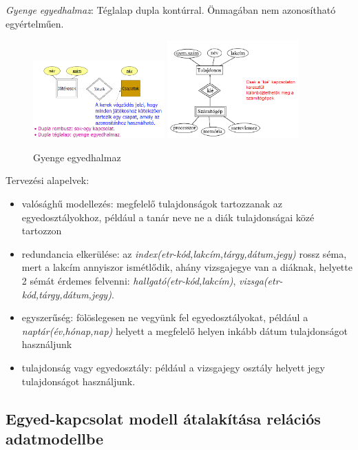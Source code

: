 \documentclass[margin=0px]{article}
\begin{document}
\textit{Gyenge egyedhalmaz}: Téglalap dupla kontúrral. Önmagában nem azonosítható egyértelműen.
\begin{figure}[H]
    \centering
    \includegraphics[width=0.45\textwidth]{img/ek5.png}
    \includegraphics[width=0.45\textwidth]{img/ek6.png}
    \caption{Gyenge egyedhalmaz}
\end{figure}
Tervezési alapelvek:
\begin{itemize}
    \item valósághű modellezés: megfelelő tulajdonságok tartozzanak az egyedosztályokhoz, például a tanár neve ne a diák tulajdonságai közé tartozzon
    \item redundancia elkerülése: az \textit{index(etr-kód,lakcím,tárgy,dátum,jegy)} rossz séma,
          mert a lakcím annyiszor ismétlődik, ahány vizsgajegye van a diáknak, helyette 2 sémát érdemes felvenni: \textit{hallgató(etr-kód,lakcím)}, \textit{vizsga(etr-kód,tárgy,dátum,jegy)}.
    \item egyszerűség: fölöslegesen ne vegyünk fel egyedosztályokat, például a \textit{naptár(év,hónap,nap)} helyett a megfelelő helyen inkább dátum tulajdonságot használjunk
    \item tulajdonság vagy egyedosztály: például a vizsgajegy osztály helyett jegy tulajdonságot
          használjunk.
\end{itemize}

\subsection{Egyed-kapcsolat modell átalakítása relációs adatmodellbe}
\end{document}
